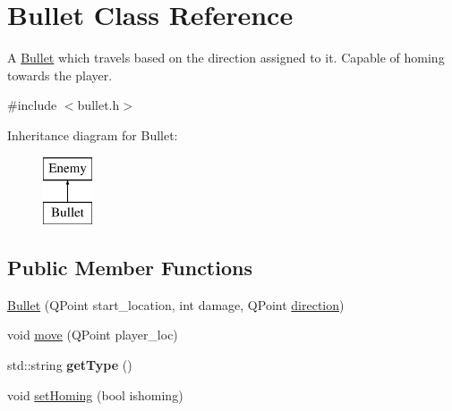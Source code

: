 \hypertarget{classBullet}{
\section{Bullet Class Reference}
\label{classBullet}
}


A \hyperlink{classBullet}{Bullet} which travels based on the direction assigned to it. Capable of homing towards the player.  




{\ttfamily \#include $<$bullet.h$>$}

Inheritance diagram for Bullet:\begin{figure}[H]
\begin{center}
\leavevmode
\includegraphics[height=2.000000cm]{classBullet}
\end{center}
\end{figure}
\subsection*{Public Member Functions}
\begin{DoxyCompactItemize}
\item 
\hyperlink{classBullet_a0c6c11ac580ffc5085b302e7c50efd0b}{Bullet} (QPoint start\_\-location, int damage, QPoint \hyperlink{classBullet_a6f7f13888018bc38f754f95412ad383a}{direction})
\item 
void \hyperlink{classBullet_a1bc25157132db7abb6cdaef7a2eb444e}{move} (QPoint player\_\-loc)
\item 
\hypertarget{classBullet_a9e8a5aa0097e3aaabaa5249ab0ce325d}{
std::string {\bfseries getType} ()}
\label{classBullet_a9e8a5aa0097e3aaabaa5249ab0ce325d}

\item 
void \hyperlink{classBullet_a53c9638158518d911a823e9d146fb1f9}{setHoming} (bool ishoming)
\end{DoxyCompactItemize}
